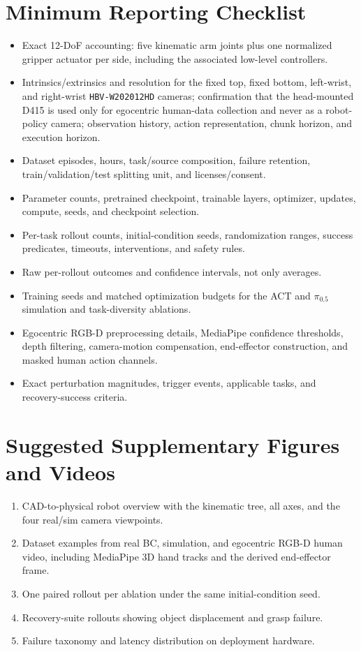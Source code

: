 \documentclass[10pt,conference]{IEEEtran}
\begin{document}
\section{Minimum Reporting Checklist}
\begin{itemize}[leftmargin=*]
    \item Exact 12-DoF accounting: five kinematic arm joints plus one normalized
    gripper actuator per side, including the associated low-level controllers.
    \item Intrinsics/extrinsics and resolution for the fixed top, fixed bottom,
    left-wrist, and right-wrist \texttt{HBV-W202012HD} cameras; confirmation
    that the head-mounted D415 is used only for egocentric human-data collection
    and never as a robot-policy camera; observation history, action
    representation, chunk horizon, and execution horizon.
    \item Dataset episodes, hours, task/source composition, failure retention,
    train/validation/test splitting unit, and licenses/consent.
    \item Parameter counts, pretrained checkpoint, trainable layers, optimizer,
    updates, compute, seeds, and checkpoint selection.
    \item Per-task rollout counts, initial-condition seeds, randomization ranges,
    success predicates, timeouts, interventions, and safety rules.
    \item Raw per-rollout outcomes and confidence intervals, not only averages.
    \item Training seeds and matched optimization budgets for the ACT and
    $\pi_{0.5}$ simulation and task-diversity ablations.
    \item Egocentric RGB-D preprocessing details, MediaPipe confidence thresholds,
    depth filtering, camera-motion compensation, end-effector construction, and
    masked human action channels.
    \item Exact perturbation magnitudes, trigger events, applicable tasks, and
    recovery-success criteria.
\end{itemize}

\section{Suggested Supplementary Figures and Videos}
\begin{enumerate}[leftmargin=*]
    \item CAD-to-physical robot overview with the kinematic tree, all axes, and
    the four real/sim camera viewpoints.
    \item Dataset examples from real BC, simulation, and egocentric RGB-D human
    video, including MediaPipe 3D hand tracks and the derived end-effector frame.
    \item One paired rollout per ablation under the same initial-condition seed.
    \item Recovery-suite rollouts showing object displacement and grasp failure.
    \item Failure taxonomy and latency distribution on deployment hardware.
\end{enumerate}
\end{document}
